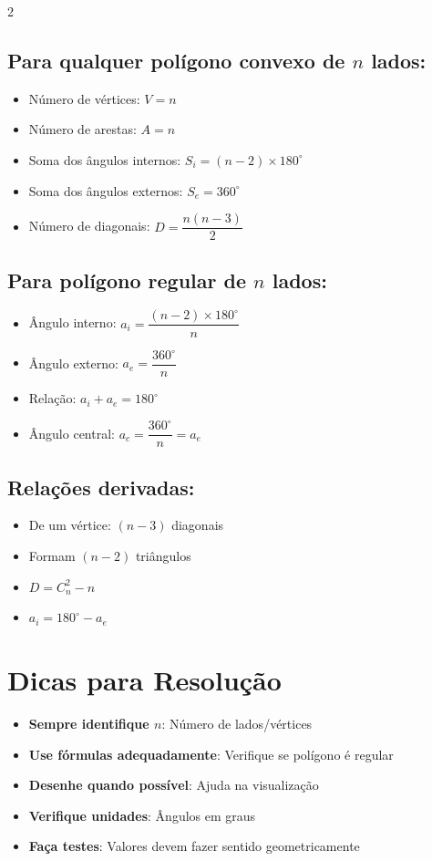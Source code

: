 \documentclass[11pt]{article}
\begin{document}
\begin{multicols}{2}
\subsection*{Para qualquer polígono convexo de $n$ lados:}
\begin{itemize}
\item Número de vértices: $V = n$
\item Número de arestas: $A = n$
\item Soma dos ângulos internos: $S_i = (n-2) \times 180^\circ$
\item Soma dos ângulos externos: $S_e = 360^\circ$
\item Número de diagonais: $D = \dfrac{n(n-3)}{2}$
\end{itemize}

\subsection*{Para polígono regular de $n$ lados:}
\begin{itemize}
\item Ângulo interno: $a_i = \dfrac{(n-2) \times 180^\circ}{n}$
\item Ângulo externo: $a_e = \dfrac{360^\circ}{n}$
\item Relação: $a_i + a_e = 180^\circ$
\item Ângulo central: $a_c = \dfrac{360^\circ}{n} = a_e$
\end{itemize}

\subsection*{Relações derivadas:}
\begin{itemize}
\item De um vértice: $(n-3)$ diagonais
\item Formam $(n-2)$ triângulos
\item $D = C_n^2 - n$
\item $a_i = 180^\circ - a_e$
\end{itemize}

\section*{Dicas para Resolução}

\begin{itemize}
\item \textbf{Sempre identifique $n$}: Número de lados/vértices
\item \textbf{Use fórmulas adequadamente}: Verifique se polígono é regular
\item \textbf{Desenhe quando possível}: Ajuda na visualização
\item \textbf{Verifique unidades}: Ângulos em graus
\item \textbf{Faça testes}: Valores devem fazer sentido geometricamente
\end{itemize}


\end{multicols}
\end{document}
